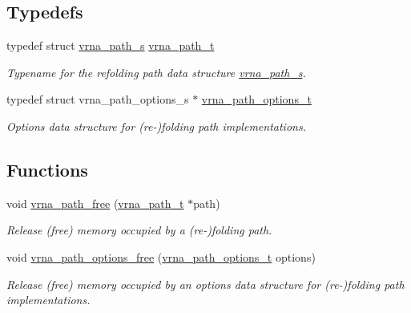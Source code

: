 \subsection*{Typedefs}
\begin{DoxyCompactItemize}
\item 
\mbox{\label{group__paths_ga818d4f3d1cf8723d6905990b08d909fe}} 
typedef struct \mbox{\hyperlink{group__paths_structvrna__path__s}{vrna\+\_\+path\+\_\+s}} \mbox{\hyperlink{group__paths_ga818d4f3d1cf8723d6905990b08d909fe}{vrna\+\_\+path\+\_\+t}}
\begin{DoxyCompactList}\small\item\em Typename for the refolding path data structure \mbox{\hyperlink{group__paths_structvrna__path__s}{vrna\+\_\+path\+\_\+s}}. \end{DoxyCompactList}\item 
\mbox{\label{group__paths_gaa99d8ec48f64de53eda0d51b1ed0d3d1}} 
typedef struct vrna\+\_\+path\+\_\+options\+\_\+s $\ast$ \mbox{\hyperlink{group__paths_gaa99d8ec48f64de53eda0d51b1ed0d3d1}{vrna\+\_\+path\+\_\+options\+\_\+t}}
\begin{DoxyCompactList}\small\item\em Options data structure for (re-\/)folding path implementations. \end{DoxyCompactList}\end{DoxyCompactItemize}
\subsection*{Functions}
\begin{DoxyCompactItemize}
\item 
void \mbox{\hyperlink{group__paths_ga3763dc16760d09277a1b1c3f3061d0c7}{vrna\+\_\+path\+\_\+free}} (\mbox{\hyperlink{group__paths_ga818d4f3d1cf8723d6905990b08d909fe}{vrna\+\_\+path\+\_\+t}} $\ast$path)
\begin{DoxyCompactList}\small\item\em Release (free) memory occupied by a (re-\/)folding path. \end{DoxyCompactList}\item 
void \mbox{\hyperlink{group__paths_gaa64a86b13cb165346a0d0c788781512a}{vrna\+\_\+path\+\_\+options\+\_\+free}} (\mbox{\hyperlink{group__paths_gaa99d8ec48f64de53eda0d51b1ed0d3d1}{vrna\+\_\+path\+\_\+options\+\_\+t}} options)
\begin{DoxyCompactList}\small\item\em Release (free) memory occupied by an options data structure for (re-\/)folding path implementations. \end{DoxyCompactList}\end{DoxyCompactItemize}



